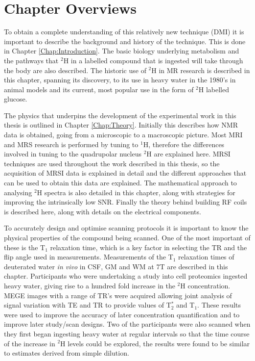\section{Chapter Overviews}

To obtain a complete understanding of this relatively new technique (\ac{DMI}) it is important to describe the background and history of the technique. This is done in Chapter \ref{Chap:Introduction}. The basic biology underlying metabolism and the pathways that $^2$H in a labelled compound that is ingested will take through the body are also described. The historic use of $^2$H in MR research is described in this chapter, spanning its discovery, to its use in heavy water in the 1980's in animal models and its current, most popular use in the form of $^2$H labelled glucose.

The physics that underpins the development of the experimental work in this thesis is outlined in Chapter \ref{Chap:Theory}. Initially this describes how \ac{NMR} data is obtained, going from a microscopic to a macroscopic picture. Most \ac{MRI} and \ac{MRS} research is performed by tuning to $^1$H, therefore the differences involved in tuning to the quadrupolar nucleus $^2$H are explained here. \Ac{MRSI} techniques are used throughout the work described in this thesis, so the acquisition of \ac{MRSI} data is explained in detail and the different approaches that can be used to obtain this data are explained. The mathematical approach to analysing $^2$H spectra is also detailed in this chapter, along with strategies for improving the intrinsically low \ac{SNR}. Finally the theory behind building \ac{RF} coils is described here, along with details on the electrical components.

To accurately design and optimise scanning protocols it is important to know the physical properties of the compound being scanned. One of the most important of these is the T$_1$ relaxation time, which is a key factor in selecting the \ac{TR} and the flip angle used in measurements. Measurements of the T$_1$ relaxation times of deuterated water \textit{in vivo} in \ac{CSF}, \ac{GM} and \ac{WM} at 7T are described in this chapter. Participants who were undertaking a study into cell proteomics ingested heavy water, giving rise to a hundred fold increase in the $^2$H concentration. \ac{MEGE} images with a range of \ac{TR}'s were acquired allowing joint analysis of signal variation with \ac{TE} and \ac{TR} to provide values of T$_2^*$ and T$_1$. These results were used to improve the accuracy of later concentration quantification and to improve later study/scan designs. Two of the participants were also scanned when they first began ingesting heavy water at regular intervals so that the time course of the increase in $^2$H levels could be explored, the results were found to be similar to estimates derived from simple dilution.

